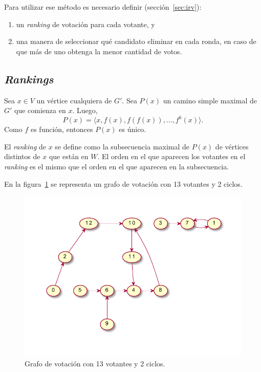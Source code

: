 Para utilizar ese m\'etodo es necesario definir (secci\'on~\ref{sec:irv}):
\begin{enumerate}
    \item un \textit{ranking} de votaci\'on para cada votante, y
    \item una manera de seleccionar qu\'e candidato eliminar en cada ronda, en caso de que m\'as de uno  obtenga la menor cantidad de votos.
\end{enumerate}  

\subsection{\textit{Rankings}}
Sea $x \in V$ un v\'ertice cualquiera de $G'$. Sea $P(x)$ un camino simple maximal de $G'$ que comienza en $x$. Luego,
$$
P(x) = \langle x, f(x), f(f(x)), \ldots, f^{k}(x) \rangle.
$$
Como $f$ es funci\'on, entonces $P(x)$ es \'unico. 

El \textit{ranking} de $x$ se define como  la subsecuencia maximal de $P(x)$ de v\'ertices distintos de $x$ que est\'an en $W$. El orden en el que aparecen los votantes en el \textit{ranking} es el mismo que el orden en el que aparecen en la subsecuencia.

En la figura~\ref{fig:graph-13-voters-2-cycles} se representa un grafo de votaci\'on con 13 votantes y 2 ciclos.

\begin{figure}[h!]
    \centering
    \includegraphics[scale=.9]{Graphics/graph-13-voters-2-cycles-largest-has-4.pdf}
    \caption{Grafo de votaci\'on con 13 votantes y 2 ciclos.}
    \label{fig:graph-13-voters-2-cycles}
\end{figure}

